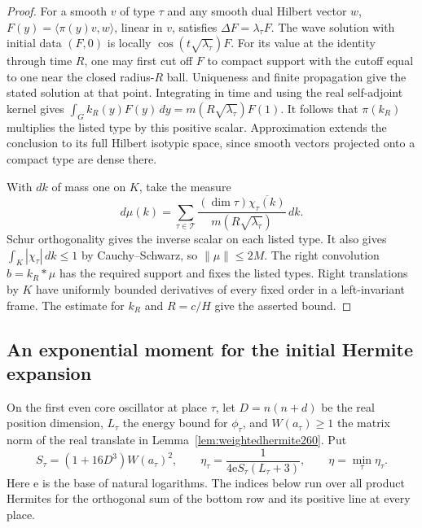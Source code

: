 \documentclass[a4paper,11pt]{article}
\theoremstyle{definition}
\theoremstyle{remark}
\numberwithin{equation}{section}
\begin{document}
\begin{proof}
For a smooth \(v\) of type \(\tau\) and any smooth dual
Hilbert vector \(w\), \(F(y)=\langle\pi(y)v,w\rangle\),
linear in \(v\), satisfies \(\Delta F=\lambda_\tau F\).
The wave solution with initial data \((F,0)\) is locally
\(\cos(t\sqrt{\lambda_\tau})F\). For its value at the
identity through time \(R\), one may first cut off \(F\)
to compact support with the cutoff equal to one near the
closed radius-\(R\) ball. Uniqueness and finite propagation
give the stated solution at that point. Integrating in time
and using the real self-adjoint kernel gives
\(\int_G k_R(y)F(y)\,dy=m(R\sqrt{\lambda_\tau})F(1)\).
It follows that \(\pi(k_R)\) multiplies the listed type by
this positive scalar. Approximation extends the conclusion
to its full Hilbert isotypic space, since smooth vectors
projected onto a compact type are dense there.

With \(dk\) of mass one on \(K\), take the measure
\[
  d\mu(k)=\sum_{\tau\in\mathcal T}
       \frac{(\dim\tau)\overline{\chi_\tau(k)}}
            {m(R\sqrt{\lambda_\tau})}\,dk .
\]
Schur orthogonality gives the inverse scalar on each listed
type. It also gives \(\int_K|\chi_\tau|\,dk\le1\) by
Cauchy--Schwarz, so \(\|\mu\|\le2M\). The right convolution
\(b=k_R*\mu\) has the required support and fixes the listed
types. Right translations by \(K\) have uniformly bounded
derivatives of every fixed order in a left-invariant frame.
The estimate for \(k_R\) and \(R=c/H\) give the asserted
bound.
\end{proof}

\subsection{An exponential moment for the initial Hermite expansion}\label{nav:VI-44}
On the first even core oscillator at place \(\tau\), let
\(D=n(n+d)\) be the real position dimension, \(L_\tau\) the
energy bound for \(\phi_\tau\), and \(W(a_\tau)\ge1\) the
matrix norm of the real translate in
Lemma~\ref{lem:weightedhermite260}. Put
\[
 S_\tau=(1+16D^3)W(a_\tau)^2,\qquad
 \eta_\tau=\frac{1}{4\mathrm e S_\tau(L_\tau+3)},\qquad
 \eta=\min_\tau\eta_\tau .
\]
Here \(\mathrm e\) is the base of natural logarithms. The
indices below run over all product Hermites for the
orthogonal sum of the bottom row and its positive line at
every place.
\end{document}
